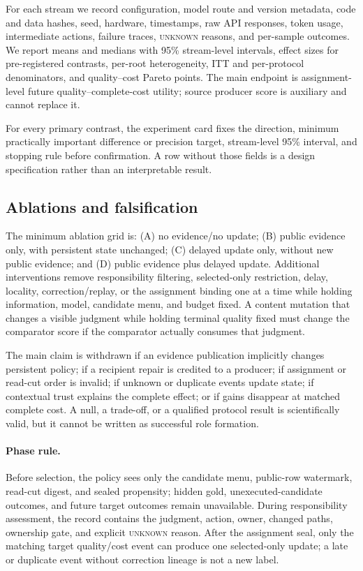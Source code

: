 \documentclass[sigconf,anonymous]{aamas}
\newcommand{\unknown}{\textsc{unknown}}
\begin{document}
For each stream we record configuration, model route and version metadata, code and data hashes, seed, hardware, timestamps, raw API responses, token usage, intermediate actions, failure traces, \unknown{} reasons, and per-sample outcomes. We report means and medians with 95\% stream-level intervals, effect sizes for pre-registered contrasts, per-root heterogeneity, ITT and per-protocol denominators, and quality--cost Pareto points. The main endpoint is assignment-level future quality--complete-cost utility; source producer score is auxiliary and cannot replace it.

For every primary contrast, the experiment card fixes the direction, minimum practically important difference or precision target, stream-level 95\% interval, and stopping rule before confirmation. A row without those fields is a design specification rather than an interpretable result.

\subsection{Ablations and falsification}
The minimum ablation grid is: (A) no evidence/no update; (B) public evidence only, with persistent state unchanged; (C) delayed update only, without new public evidence; and (D) public evidence plus delayed update. Additional interventions remove responsibility filtering, selected-only restriction, delay, locality, correction/replay, or the assignment binding one at a time while holding information, model, candidate menu, and budget fixed. A content mutation that changes a visible judgment while holding terminal quality fixed must change the comparator score if the comparator actually consumes that judgment.

The main claim is withdrawn if an evidence publication implicitly changes persistent policy; if a recipient repair is credited to a producer; if assignment or read-cut order is invalid; if unknown or duplicate events update state; if contextual trust explains the complete effect; or if gains disappear at matched complete cost. A null, a trade-off, or a qualified protocol result is scientifically valid, but it cannot be written as successful role formation.

\paragraph{Phase rule.} Before selection, the policy sees only the candidate menu, public-row watermark, read-cut digest, and sealed propensity; hidden gold, unexecuted-candidate outcomes, and future target outcomes remain unavailable. During responsibility assessment, the record contains the judgment, action, owner, changed paths, ownership gate, and explicit \unknown{} reason. After the assignment seal, only the matching target quality/cost event can produce one selected-only update; a late or duplicate event without correction lineage is not a new label.
\end{document}
